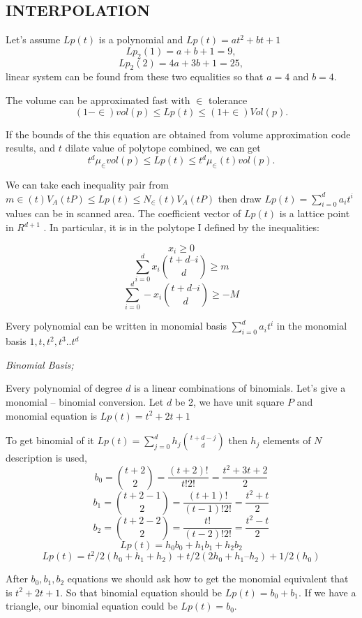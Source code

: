 \documentclass[12pt,twoside]{article}
\begin{document}
\subsection{INTERPOLATION}
\par
Let's assume $Lp(t)$ is a polynomial and $Lp(t) = at^2 + bt + 1$
\[ Lp_2(1) = a + b + 1 = 9,\]
\[ Lp_2(2) = 4a + 3b + 1 = 25,\]
linear system can be found from these two equalities so that $a = 4$ and $b = 4$.\newline
\par 
The volume can be approximated fast with $\in$ tolerance
\[(1- \in)vol(p) \leq Lp(t) \leq (1 + \in)Vol(p).\]
\par
If the bounds of the this equation are obtained from volume
approximation code results, and $t$ dilate value of polytope combined, we can get
\[t^d \mu_\in vol(p) \leq Lp(t) \leq t^d \mu_\in(t)vol(p).\]
\par
We can take each inequality pair from $	m\in(t)V_A(tP) \leq Lp(t) \leq N_\in(t)V_A(tP)$ then
draw $Lp(t) = \sum\limits_{i=0}^d  a_it^i$ values can be in scanned area. The coefficient vector of
$Lp(t)$ is a lattice point in $R^{d+1}$ . In particular, it is in the polytope I defined by the
inequalities: \newline

\[x_i \geq 0\]
\[ \sum\limits_{i=0}^d x_i{{t +d – i}\choose{d}} \geq m \]
\[ \sum\limits_{i=0}^d -x_i {{t +d – i}\choose{d}}  \geq -M\]
\par
Every polynomial can be written in monomial basis $\sum\limits_{i=0}^d  a_it^i$ in the monomial
basis $1,t,t^2 ,t^3 .. t^d$

\textit{Binomial Basis;} \newline
\par
Every polynomial of degree $d$ is a linear combinations of binomials. Let's give a
monomial – binomial conversion. Let $d$ be 2, we have unit square $P$ and monomial
equation is $Lp(t) = t^2 + 2t + 1$ \newline
\par
To get binomial of it $Lp(t) = \sum\limits_{j=0}^d h_j{{t + d -j}\choose {d}}$ then $h_j$ elements of $N$
description is used,
\[ b_0 = {{t + 2}\choose {2}} = \frac{(t+2)!}{t! 2!} = \frac{t^2 + 3t +2}{2}\]
\[ b_1 = {{t + 2 -1 }\choose {2}} = \frac{(t+1)!}{(t - 1)! 2!} = \frac{t^2 + t}{2}\]
\[ b_2 = {{t + 2 - 2}\choose {2}} = \frac{t!}{(t-2)! 2!} = \frac{t^2 -t}{2}\]
\[ Lp(t) = h_0b_ 0 + h_1b_1 + h_2b_2 \]
\[ Lp(t) = t^2 /2 (h_0 + h_1 + h_2 ) + t/2 (2h_0 + h_1 – h_2 ) + 1/2(h_0 )\]
\par
After $b_0 ,b_1 ,b_2$ equations we should ask how to get the monomial equivalent
that is $t^2 + 2t + 1$. So that binomial equation should be $Lp(t) = b_0 + b_1.$ If we have a
triangle, our binomial equation could be $Lp(t) = b_0.$ \newline
\end{document}
